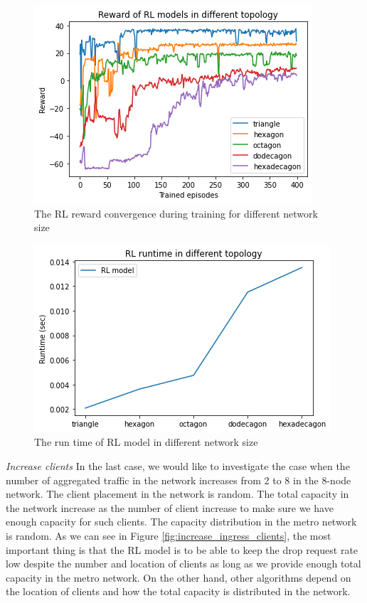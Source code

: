 \documentclass[conference]{IEEEtran}
\begin{document}
\begin{figure}[]
    \centering
    \includegraphics[scale = 0.5]{imgs/reward_different_topology.png}
    \caption{The RL reward convergence during training for different network size}
    \label{fig:reward_different_topology}
\end{figure}

\begin{figure}[]
    \centering
    \includegraphics[scale = 0.5]{imgs/runtime_topology.png}
    \caption{The run time of RL model in different network size}
    \label{fig:runtime_topology}
\end{figure}

\textit{Increase clients}
In the last case, we would like to investigate the case when the number of aggregated traffic in the network increases from 2 to 8 in the 8-node network. The client placement in the network is random. The total capacity in the network increase as the number of client increase to make sure we have enough capacity for such clients. The capacity distribution in the metro network is random. As we can see in Figure \ref{fig:increase_ingress_clients}, the most important thing is that the RL model is to be able to keep the drop request rate low despite the number and location of clients as long as we provide enough total capacity in the metro network. On the other hand, other algorithms depend on the location of clients and how the total capacity is distributed in the network.
\end{document}
